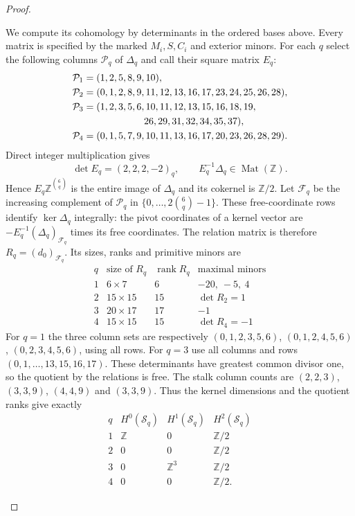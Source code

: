 \begin{proof}
\begin{enumerate}[label=\arabic*.,leftmargin=*]
We compute its cohomology by determinants in the ordered bases above.
Every matrix is specified by the marked $M_i,S,C_i$ and exterior minors.
For each $q$ select the following columns $\mathcal P_q$ of
$\Delta_q$ and call their square matrix $E_q$:
\[
\begin{aligned}
\mathcal P_1&=(1,2,5,8,9,10),\\
\mathcal P_2&=(0,1,2,8,9,11,12,13,16,17,23,24,25,26,28),\\
\mathcal P_3&=(1,2,3,5,6,10,11,12,13,15,16,18,19,\\
             &\hspace{22mm}26,29,31,32,34,35,37),\\
\mathcal P_4&=(0,1,5,7,9,10,11,13,16,17,20,23,26,28,29).
\end{aligned}
\]
Direct integer multiplication gives
\[
 \det E_q=(2,2,2,-2)_q,\qquad
 E_q^{-1}\Delta_q\in\operatorname{Mat}(\mathbb Z).
\]
Hence $E_q\mathbb Z^{\binom6q}$ is the entire image of
$\Delta_q$ and its cokernel is $\mathbb Z/2$.
Let $\mathcal F_q$ be the increasing complement of $\mathcal P_q$
in $\{0,\ldots,2\binom6q-1\}$.
These free-coordinate rows identify $\ker\Delta_q$ integrally:
the pivot coordinates of a kernel vector are
$-E_q^{-1}(\Delta_q)_{\mathcal F_q}$ times its free coordinates.
The relation matrix is therefore $R_q=(d_0)_{\mathcal F_q}$.
Its sizes, ranks and primitive minors are
\[
\begin{array}{c|c|c|l}
q&\text{size of }R_q&\operatorname{rank}R_q&
\text{maximal minors}\\ \hline
1&6\times7&6&-20,\ -5,\ 4\\
2&15\times15&15&\det R_2=1\\
3&20\times17&17&-1\\
4&15\times15&15&\det R_4=-1
\end{array}
\]
For $q=1$ the three column sets are respectively
$(0,1,2,3,5,6)$, $(0,1,2,4,5,6)$, $(0,2,3,4,5,6)$,
using all rows.  For $q=3$ use all columns and rows
$(0,1,\ldots,13,15,16,17)$.
These determinants have greatest common divisor one, so the
quotient by the relations is free.  The stalk column counts are
$(2,2,3)$, $(3,3,9)$, $(4,4,9)$ and $(3,3,9)$.
Thus the kernel dimensions and the quotient ranks give exactly
\[
\begin{array}{c|ccc}
q&H^0(\mathcal S_q)&H^1(\mathcal S_q)&H^2(\mathcal S_q)\\ \hline
1&\mathbb Z&0&\mathbb Z/2\\
2&0&0&\mathbb Z/2\\
3&0&\mathbb Z^3&\mathbb Z/2\\
4&0&0&\mathbb Z/2.
\end{array}
\]


\end{enumerate}
\end{proof}
